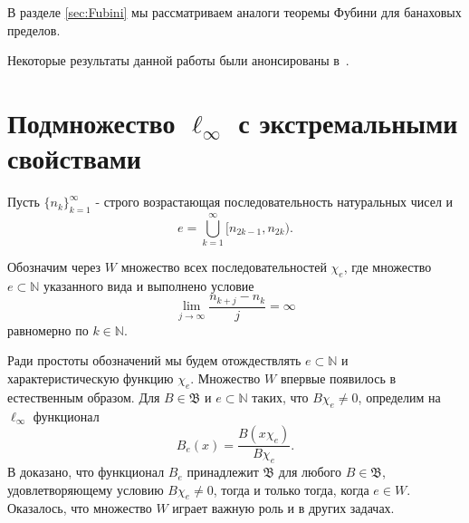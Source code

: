 \documentclass[12pt]{article}
\def\N{{\mathbb{N}}}
\def\B{{\mathfrak{B}}}
\begin{document}
В разделе \ref{sec:Fubini} мы рассматриваем аналоги теоремы Фубини для банаховых пределов.


Некоторые результаты данной работы были анонсированы в~\cite{AvSU}.







\section{Подмножество $\ell_\infty$ с экстремальными свойствами}\label{sec:W}

Пусть $\{n_k\}_{k=1}^\infty$ - строго возрастающая  последовательность натуральных чисел и
\begin{equation}\label{e}
e =\bigcup\limits_{k=1}^\infty \lbrack n_{2k-1},n_{2k}).
\end{equation}

Обозначим через $W$ множество всех последовательностей $\chi_e$, где множество  $e \subset \N$ указанного вида
и выполнено условие
\begin{equation}\label{growth_cond}
    \lim\limits_{j\to\infty}\frac{n_{k+j}-n_k}j=\infty
\end{equation}
равномерно по $k\in \mathbb N$.

Ради простоты обозначений мы будем отождествлять $e \subset \N$ и характеристическую функцию $\chi_e$. Множество $W$ впервые появилось в~\cite[\S 5]{SSU2} естественным образом. Для $B\in \B$ и $e\subset \N$ таких, что $B\chi_e\neq 0$, определим на $\ell_\infty$ функционал
$$B_e(x)=\frac{B(x\chi_e)}{B\chi_e}.$$
В \cite[Т. 25]{SSU2} доказано, что функционал $B_e$ принадлежит $\B$ для любого $B\in \B$, удовлетворяющему условию $B\chi_e\neq 0$, тогда и только тогда, когда $e\in W$. Оказалось, что множество $W$ играет важную роль и в других задачах.


\end{document}
